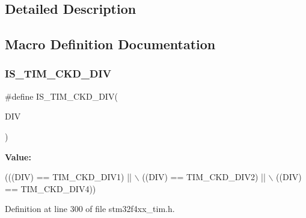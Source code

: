 \subsection{Detailed Description}


\subsection{Macro Definition Documentation}
\mbox{\label{group___t_i_m___clock___division___c_k_d_ga9298ec9ad2d578a4c54e6c0dd4c03946}} 
\subsubsection{\texorpdfstring{I\+S\+\_\+\+T\+I\+M\+\_\+\+C\+K\+D\+\_\+\+D\+IV}{IS\_TIM\_CKD\_DIV}}
{\footnotesize\ttfamily \#define I\+S\+\_\+\+T\+I\+M\+\_\+\+C\+K\+D\+\_\+\+D\+IV(\begin{DoxyParamCaption}\item[{}]{D\+IV }\end{DoxyParamCaption})}

{\bfseries Value\+:}
\begin{DoxyCode}
(((DIV) == TIM\_CKD\_DIV1) || \(\backslash\)
                             ((DIV) == TIM\_CKD\_DIV2) || \(\backslash\)
                             ((DIV) == TIM\_CKD\_DIV4))
\end{DoxyCode}


Definition at line 300 of file stm32f4xx\+\_\+tim.\+h.


